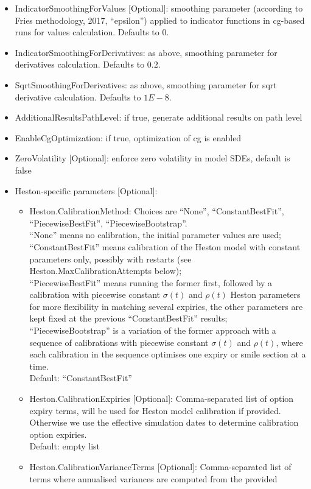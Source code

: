 \begin{itemize}
\item IndicatorSmoothingForValues [Optional]: smoothing parameter (according to Fries methodology, 2017, ``epsilon'')
  applied to indicator functions in cg-based runs for values calculation. Defaults to $0$.
\item IndicatorSmoothingForDerivatives: as above, smoothing parameter for derivatives calculation. Defaults to $0.2$.
\item SqrtSmoothingForDerivatives: as above, smoothing parameter for sqrt derivative calculation. Defaults to $1E-8$.
\item AdditionalResultsPathLevel: if true, generate additional results on path level
\item EnableCgOptimization: if true, optimization of cg is enabled
\item ZeroVolatility [Optional]: enforce zero volatility in model SDEs, default is false
\item Heston-specific parameters [Optional]:
  \begin{itemize}
  \item Heston.CalibrationMethod: Choices are ``None'', ``ConstantBestFit'', ``PiecewiseBestFit'', ``PiecewiseBootstrap''. \\
    ``None'' means no calibration, the initial parameter values are used; \\
    ``ConstantBestFit'' means calibration of the Heston model with constant parameters only, possibly with restarts (see Heston.MaxCalibrationAttempts below); \\
    ``PiecewiseBestFit'' means running the former first, followed by a calibration with piecewise constant $\sigma(t)$ and $\rho(t)$
    Heston parameters for more flexibility in matching several expiries, the other parameters are kept fixed at the previous
    ``ConstantBestFit'' results; \\
    ``PiecewiseBootstrap'' is a variation of the former approach with a sequence of calibrations with piecewise constant
    $\sigma(t)$ and $\rho(t)$, where each calibration in the sequence optimises one expiry or smile section at a time. \\
    Default: ``ConstantBestFit''
  \item Heston.CalibrationExpiries [Optional]: Comma-separated list of option expiry terms, will be used for Heston model calibration if provided.
    Otherwise we use the effective simulation dates to determine calibration option expiries. \\
    Default: empty list
  \item Heston.CalibrationVarianceTerms [Optional]: Comma-separated list of terms where annualised variances are computed from the provided

\end{itemize}
\end{itemize}
